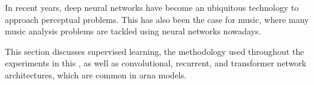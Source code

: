 

In recent years, deep neural networks have become an
ubiquitous technology to approach perceptual problems. This
has also been the case for music, where many music analysis
problems are tackled using neural networks nowadays.

This section discusses supervised learning, the methodology
used throughout the experiments in this \thesisdiss, as well
as convolutional, recurrent, and transformer network
architectures, which are common in \gls{arna} models.
